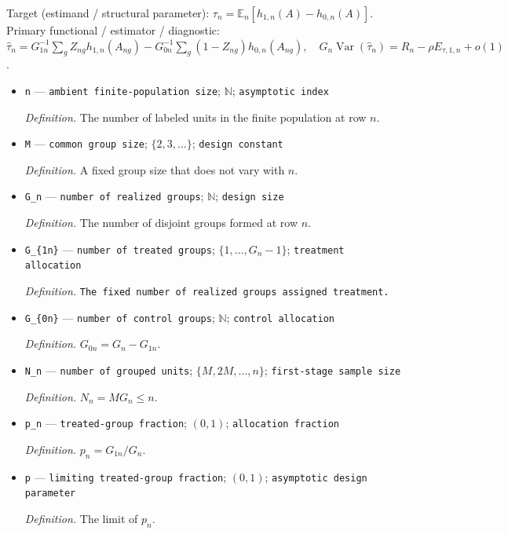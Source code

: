 \documentclass{article}
\begin{document}
Target (estimand / structural parameter): \(\tau_n=\mathbb E_n[h_{1,n}(A)-h_{0,n}(A)]\).
Primary functional / estimator / diagnostic: \(\widehat\tau_n=G_{1n}^{-1}\sum_gZ_{ng}h_{1,n}(A_{ng})-G_{0n}^{-1}\sum_g(1-Z_{ng})h_{0,n}(A_{ng}),\quad G_n\operatorname{Var}(\widehat\tau_n)=R_n-\rho E_{\tau,1,n}+o(1)\).
\begin{itemize}
  \item \texttt{n} --- \texttt{ambient finite-\allowbreak{}population size}; \(\mathbb N\); \texttt{asymptotic index}
  \par\smallskip\noindent\emph{Definition.} The number of labeled units in the finite population at row \(n\).
  \item \texttt{M} --- \texttt{common group size}; \(\{2,3,\ldots\}\); \texttt{design constant}
  \par\smallskip\noindent\emph{Definition.} A fixed group size that does not vary with \(n\).
  \item \texttt{G\_\allowbreak{}n} --- \texttt{number of realized groups}; \(\mathbb N\); \texttt{design size}
  \par\smallskip\noindent\emph{Definition.} The number of disjoint groups formed at row \(n\).
  \item \texttt{G\_\allowbreak{}\{1n\}\allowbreak{}} --- \texttt{number of treated groups}; \(\{1,\ldots,G_n-1\}\); \texttt{treatment allocation}
  \par\smallskip\noindent\emph{Definition.} \texttt{The fixed number of realized groups assigned treatment.}
  \item \texttt{G\_\allowbreak{}\{0n\}\allowbreak{}} --- \texttt{number of control groups}; \(\mathbb N\); \texttt{control allocation}
  \par\smallskip\noindent\emph{Definition.} \(G_{0n}=G_n-G_{1n}\).
  \item \texttt{N\_\allowbreak{}n} --- \texttt{number of grouped units}; \(\{M,2M,\ldots,n\}\); \texttt{first-\allowbreak{}stage sample size}
  \par\smallskip\noindent\emph{Definition.} \(N_n=MG_n\le n\).
  \item \texttt{p\_\allowbreak{}n} --- \texttt{treated-\allowbreak{}group fraction}; \((0,1)\); \texttt{allocation fraction}
  \par\smallskip\noindent\emph{Definition.} \(p_n=G_{1n}/G_n\).
  \item \texttt{p} --- \texttt{limiting treated-\allowbreak{}group fraction}; \((0,1)\); \texttt{asymptotic design parameter}
  \par\smallskip\noindent\emph{Definition.} The limit of \(p_n\).

\end{itemize}
\end{document}
